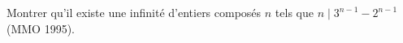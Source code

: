 Montrer qu'il existe une infinité d'entiers composés $n$ tels que $n \mid 3^{n-1} - 2^{n-1}$ (MMO 1995).

